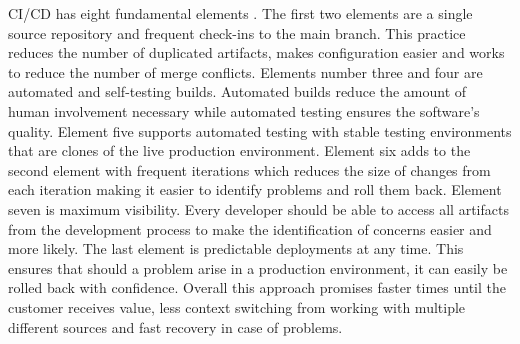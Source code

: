 CI/CD has eight fundamental elements \cite{GIT-CICD}.
The first two elements are a single source repository and frequent check-ins to the main branch.
This practice reduces the number of duplicated artifacts, makes configuration easier and
works to reduce the number of merge conflicts.
Elements number three and four are automated and self-testing builds.
Automated builds reduce the amount of human involvement necessary while automated testing ensures
the software's quality. Element five supports automated testing with stable testing environments
that are clones of the live production environment.
Element six adds to the second element with frequent iterations which reduces the size of changes
from each iteration making it easier to identify problems and roll them back.
Element seven is maximum visibility. Every developer should be able to access all artifacts from
the development process to make the identification of concerns easier and more likely.
The last element is predictable deployments at any time. This ensures that should a problem arise
in a production environment, it can easily be rolled back with confidence.
Overall this approach promises faster times until the customer receives value, less context switching
from working with multiple different sources and fast recovery in case of problems.